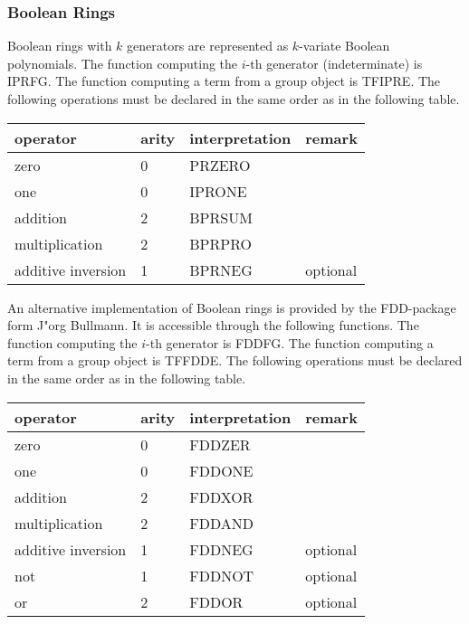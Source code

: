 \subsubsection{Boolean Rings}

Boolean rings with $k$ generators  are represented as $k$-variate
Boolean polynomials.
The function computing the $i$-th generator (indeterminate) is IPRFG. 
The function computing a term from a group object is TFIPRE.
The following operations must be declared in the same order as in the
following table.

\begin{center}
\begin{tabular}{l|l|l|l}
\hline
operator & arity & interpretation & remark \\
\hline
zero & 0 & PRZERO \\
one & 0 & IPRONE \\
addition & 2 & BPRSUM \\
multiplication & 2 & BPRPRO \\
additive inversion & 1 & BPRNEG & optional\\
\hline
\end{tabular}
\end{center}

An alternative implementation of Boolean rings is provided by the
FDD-package form J"org Bullmann.
It is accessible through the following functions.
The function computing the $i$-th generator  is FDDFG. 
The function computing a term from a group object is TFFDDE.
The following operations must be declared in the same order as in the
following table.

\begin{center}
\begin{tabular}{l|l|l|l}
\hline
operator & arity & interpretation & remark \\
\hline
zero & 0 & FDDZER \\
one & 0 & FDDONE \\
addition & 2 & FDDXOR \\
multiplication & 2 & FDDAND \\
additive inversion & 1 & FDDNEG & optional\\
not & 1 & FDDNOT & optional \\
or & 2 & FDDOR & optional \\
\hline
\end{tabular}
\end{center}